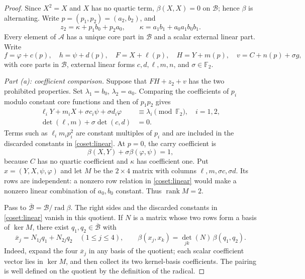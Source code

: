 \documentclass[11pt,a4paper]{article}
\theoremstyle{plain}
\theoremstyle{remark}
\newcommand{\F}{\mathbb F_2}
\newcommand{\rad}{\operatorname{rad}}
\newcommand{\rk}{\operatorname{rank}}
\begin{document}
\begin{proof}
Since $X^2=X$ and $X$ has no quartic term, $\beta(X,X)=0$ on $\mathcal B$; hence $\beta$ is alternating. Write $p=(p_1,p_2)=(a_2,b_2)$, and
\[
z_2=\kappa+p_1b_0+p_2a_0,\qquad \kappa=a_1b_1+a_0a_1b_0b_1.
\]
Every element of $\mathcal A$ has a unique core part in $\mathcal B$ and a scalar external linear part. Write
\[
f=\varphi+c(p),\quad h=\psi+d(p),\quad
F=X+\ell(p),\quad H=Y+m(p),\quad
v=C+n(p)+\sigma g,
\]
with core parts in $\mathcal B$, external linear forms $c,d,\ell,m,n$, and $\sigma\in\F$.

\emph{Part (a): coefficient comparison.} Suppose that $FH+z_2+v$ has the two prohibited properties. Set $\lambda_1=b_0$, $\lambda_2=a_0$. Comparing the coefficients of $p_i$ modulo constant core functions and then of $p_1p_2$ gives
\begin{align}
\ell_iY+m_iX+\sigma c_i\psi+\sigma d_i\varphi&\equiv\lambda_i\pmod{\F},\quad i=1,2,\label{coset:linear}\\
\det(\ell,m)+\sigma\det(c,d)&=0.\label{coset:quadratic}
\end{align}
Terms such as $\ell_i m_i p_i^2$ are constant multiples of $p_i$ and are included in the discarded constants in \eqref{coset:linear}. At $p=0$, the carry coefficient is
\begin{equation}\label{coset:carry}
\beta(X,Y)+\sigma\beta(\varphi,\psi)=1,
\end{equation}
because $C$ has no quartic coefficient and $\kappa$ has coefficient one.
Put $x=(Y,X,\psi,\varphi)$ and let $M$ be the $2\times4$ matrix with columns $\ell,m,\sigma c,\sigma d$. Its rows are independent: a nonzero row relation in \eqref{coset:linear} would make a nonzero linear combination of $a_0,b_0$ constant. Thus $\rk M=2$.

Pass to $\overline{\mathcal B}=\mathcal B/\rad\beta$. The right sides and the discarded constants in \eqref{coset:linear} vanish in this quotient. If $N$ is a matrix whose two rows form a basis of $\ker M$, there exist $q_1,q_2\in\overline{\mathcal B}$ with
\[
\overline x_j=N_{1j}q_1+N_{2j}q_2\quad(1\le j\le4),\qquad
\beta(x_j,x_k)=\det_{jk}(N)\,\beta(q_1,q_2).
\]
Indeed, expand the four $\overline x_j$ in any basis of the quotient; each scalar coefficient vector lies in $\ker M$, and then collect its two kernel-basis coefficients. The pairing is well defined on the quotient by the definition of the radical.


\end{proof}
\end{document}
